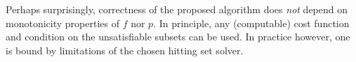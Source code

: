\documentclass[a4paper,UKenglish,cleveref, autoref, thm-restate, pdfa]{lipics-v2021}
\newcommand\m[1]{\mathcal{#1}}
\renewcommand\comment[1]{}
\newcommand{\tias}[1]{{\comment{\color{blue}Tias:#1}}}
\newcommand{\bart}[1]{{\comment{\color{OliveGreen}Bart: #1}}}
\newcommand\subsetT{\ensuremath{\m{S} }\xspace}
\newcommand\Iend{\ensuremath{I_\mathit{end} }\xspace}
\newcommand\formula{\ensuremath{\m{F} }\xspace}
\newcommand\mm[1]{\ensuremath{#1}\xspace}
\newcommand\call[1]{\mm{\texttt{#1}}}
\newcommand\grow{\mm{\call{Grow}}}
\newcommand\corrsubsets{\mm{\call{CorrSubsets}}}
\newcommand\onestep{\ensuremath{\call{Explain-One-Step}}\xspace}
\begin{document}
Perhaps surprisingly, correctness of the proposed algorithm does \emph{not} depend on monotonicity properties of $f$ nor $p$. In principle, any (computable) cost function and condition on the unsatisfiable subsets can be used. In practice however, one is bound by limitations of the chosen hitting set solver.



%


\end{document}
